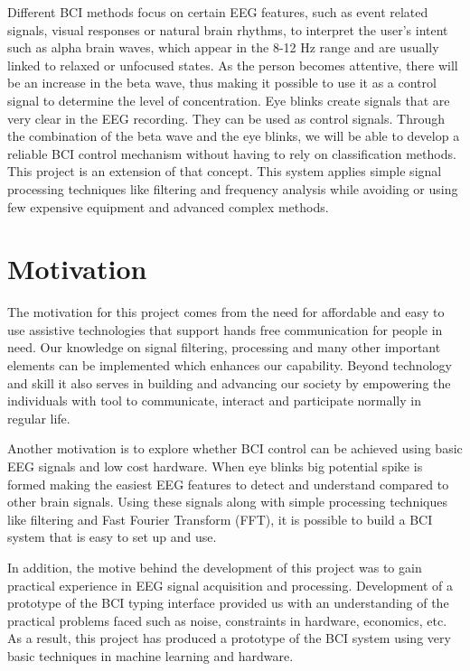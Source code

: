 Different BCI methods focus on certain EEG features, such as event related signals, visual responses or natural brain rhythms, to interpret the user’s intent such as alpha brain waves, which appear in the 8-12 Hz range and are usually linked to relaxed or unfocused states. As the person becomes attentive, there will be an increase in the beta wave, thus making it possible to use it as a control signal to determine the level of concentration. Eye blinks create signals that are very clear in the EEG recording. They can be used as control signals. Through the combination of the beta wave and the eye blinks, we will be able to develop a reliable BCI control mechanism without having to rely on classification methods. This project is an extension of that concept.
This system applies simple signal processing techniques like filtering and frequency analysis while avoiding or using few expensive equipment and advanced complex methods.

\section{Motivation}
The motivation for this project comes from the need for affordable and easy to use assistive technologies that support hands free communication for people in need. Our knowledge on signal filtering, processing and many other important elements can be implemented which enhances our capability. Beyond technology and skill it also serves in building and advancing our society by empowering the individuals with tool to communicate, interact and participate normally in regular life.

Another motivation is to explore whether BCI control can be achieved using basic EEG signals and low cost hardware. When eye blinks big potential spike is formed making the easiest EEG features to detect and understand compared to other brain signals. Using these signals along with simple processing techniques like filtering and Fast Fourier Transform (FFT), it is possible to build a BCI system that is easy to set up and use.

In addition, the motive behind the development of this project was to gain practical experience in EEG signal acquisition and processing. Development of a prototype of the BCI typing interface provided us with an understanding of the practical problems faced such as noise, constraints in hardware, economics, etc. As a result, this project has produced a prototype of the BCI system using very basic techniques in machine learning and hardware.

